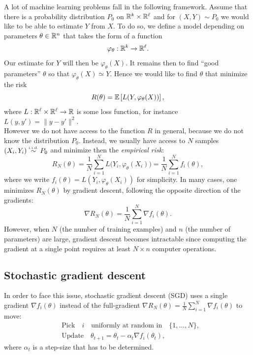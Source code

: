 \documentclass[11pt,nocut]{article}
\begin{document}
A lot of machine learning problems fall in the following framework.
Assume that there is a probability distribution $P_0$ on $\mathbb{R}^k \times \mathbb{R}^{\ell}$ and for $(X,Y) \sim P_0$ we would like to be able to estimate $Y$ from $X$. To do so, we define a model depending on parameters $\theta \in \mathbb{R}^n$ that takes the form of a function
$$
	\varphi_{\theta}:  \mathbb{R}^k  \to  \mathbb{R}^{\ell}.
$$
Our estimate for $Y$ will then be $\varphi_{\theta}(X)$. It remains then to find ``good parameters'' $\theta$ so that $\varphi_{\theta}(X) \simeq Y$. Hence we would like to find $\theta$ that minimize the risk
\begin{equation}
R(\theta) = \mathbb{E} \left[L(Y,\varphi_{\theta}(X))\right],
\end{equation}
where $L:\mathbb{R}^{\ell} \times \mathbb{R}^{\ell} \to \mathbb{R}$ is some loss function, for instance $L(y,y') = \|y-y'\|^2$.
\\

However we do not have access to the function $R$ in general, because we do not know the distribution $P_0$. Instead, we usually have access to $N$ samples $(X_i,Y_i) \overset{\text{\tiny i.i.d.}}{\sim} P_0$ and minimize then the \emph{empirical risk}:
$$
R_N(\theta) = \frac{1}{N} \sum_{i=1}^N L\big(Y_i, \varphi_{\theta}(X_i)\big) = \frac{1}{N} \sum_{i=1}^N f_i(\theta),
$$
where we write $f_i(\theta) = L(Y_i,\varphi_{\theta}(X_i))$ for simplicity. In many cases, one minimizes $R_N(\theta)$ by gradient descent, following the opposite direction of the gradients:
$$
\nabla R_N (\theta) = \frac{1}{N} \sum_{i=1}^N \nabla f_i(\theta).
$$
However, when $N$ (the number of training examples) and $n$ (the number of parameters) are large, gradient descent becomes intractable since computing the gradient at a single point requires at least $N \times n$ computer operations.

\subsection{Stochastic gradient descent}

In order to face this issue, stochastic gradient descent (SGD) uses a single gradient $\nabla f_i(\theta)$ instead of the full-gradient $\nabla R_N(\theta) = \frac{1}{N} \sum_{i=1}^N \nabla f_i(\theta)$ to move:
\begin{align*}
	&\text{Pick} \quad i \quad \text{uniformly at random in} \quad \{1, \dots, N\}, \\
	&\text{Update} \quad \theta_{t+1} = \theta_t - \alpha_t \nabla f_i(\theta_t),
\end{align*}
where $\alpha_t$ is a step-size that has to be determined.
\\
\end{document}
